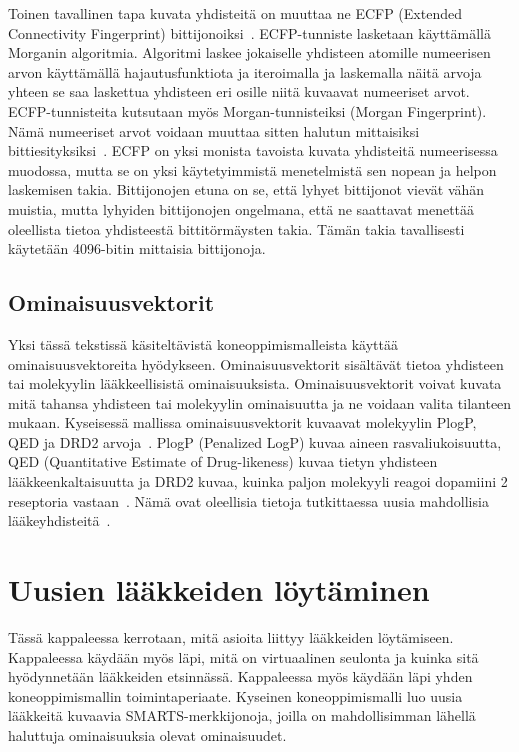\documentclass[finnish,twoside,censored,tkt,sw-line]{HYthesisML}
\begin{document}
Toinen tavallinen tapa kuvata yhdisteitä on muuttaa ne ECFP (Extended Connectivity Fingerprint) bittijonoiksi~\cite{RogersDavid2010EF}.
ECFP-tunniste lasketaan käyttämällä Morganin algoritmia.
Algoritmi laskee jokaiselle yhdisteen atomille numeerisen arvon käyttämällä hajautusfunktiota ja iteroimalla ja laskemalla näitä arvoja yhteen se saa laskettua yhdisteen eri osille niitä kuvaavat numeeriset arvot.
ECFP-tunnisteita kutsutaan myös Morgan-tunnisteiksi (Morgan Fingerprint).
Nämä numeeriset arvot voidaan muuttaa sitten halutun mittaisiksi bittiesityksiksi~\cite{RogersDavid2010EF}.
ECFP on yksi monista tavoista kuvata yhdisteitä numeerisessa muodossa, mutta se on yksi käytetyimmistä menetelmistä sen nopean ja helpon laskemisen takia.
Bittijonojen etuna on se, että lyhyet bittijonot vievät vähän muistia, mutta lyhyiden bittijonojen ongelmana, että ne saattavat menettää oleellista tietoa yhdisteestä bittitörmäysten takia.
Tämän takia tavallisesti käytetään 4096-bitin mittaisia bittijonoja.

\section{Ominaisuusvektorit}

Yksi tässä tekstissä käsiteltävistä koneoppimismalleista käyttää ominaisuusvektoreita hyödykseen.
Ominaisuusvektorit sisältävät tietoa yhdisteen tai molekyylin lääkkeellisistä ominaisuuksista.
Ominaisuusvektorit voivat kuvata mitä tahansa yhdisteen tai molekyylin ominaisuutta ja ne voidaan valita tilanteen mukaan.
Kyseisessä mallissa ominaisuusvektorit kuvaavat molekyylin PlogP, QED ja DRD2 arvoja~\cite{ShinBonggun}.
PlogP (Penalized LogP) kuvaa aineen rasvaliukoisuutta, QED (Quantitative Estimate of Drug-likeness) kuvaa tietyn yhdisteen lääkkeenkaltaisuutta ja DRD2 kuvaa, kuinka paljon molekyyli reagoi dopamiini 2 reseptoria vastaan~\cite{BickertonGRichard2012Qtcb}.
Nämä ovat oleellisia tietoja tutkittaessa uusia mahdollisia lääkeyhdisteitä~\cite{ShinBonggun}.

\chapter{Uusien lääkkeiden löytäminen}

Tässä kappaleessa kerrotaan, mitä asioita liittyy lääkkeiden löytämiseen.
Kappaleessa käydään myös läpi, mitä on virtuaalinen seulonta ja kuinka sitä hyödynnetään lääkkeiden etsinnässä.
Kappaleessa myös käydään läpi yhden koneoppimismallin toimintaperiaate.
Kyseinen koneoppimismalli luo uusia lääkkeitä kuvaavia SMARTS-merkkijonoja, joilla on mahdollisimman lähellä haluttuja ominaisuuksia olevat ominaisuudet.
\end{document}
